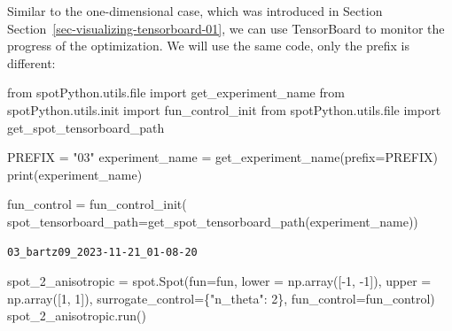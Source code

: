 \documentclass[
  letterpaper,
  DIV=11,
  numbers=noendperiod]{scrreprt}
\newenvironment{Shaded}{\begin{snugshade}}{\end{snugshade}}
\newcommand{\BuiltInTok}[1]{\textcolor[rgb]{0.00,0.23,0.31}{#1}}
\newcommand{\DecValTok}[1]{\textcolor[rgb]{0.68,0.00,0.00}{#1}}
\newcommand{\ImportTok}[1]{\textcolor[rgb]{0.00,0.46,0.62}{#1}}
\newcommand{\NormalTok}[1]{\textcolor[rgb]{0.00,0.23,0.31}{#1}}
\newcommand{\OperatorTok}[1]{\textcolor[rgb]{0.37,0.37,0.37}{#1}}
\newcommand{\StringTok}[1]{\textcolor[rgb]{0.13,0.47,0.30}{#1}}
\begin{document}
\begin{tcolorbox}[enhanced jigsaw, left=2mm, toprule=.15mm, colframe=quarto-callout-note-color-frame, leftrule=.75mm, title=\textcolor{quarto-callout-note-color}{\faInfo}\hspace{0.5em}{TensorBoard}, toptitle=1mm, opacitybacktitle=0.6, arc=.35mm, titlerule=0mm, opacityback=0, bottomtitle=1mm, coltitle=black, rightrule=.15mm, colback=white, colbacktitle=quarto-callout-note-color!10!white, breakable, bottomrule=.15mm]

Similar to the one-dimensional case, which was introduced in Section
Section~\ref{sec-visualizing-tensorboard-01}, we can use TensorBoard to
monitor the progress of the optimization. We will use the same code,
only the prefix is different:

\begin{Shaded}
\begin{Highlighting}[]
\ImportTok{from}\NormalTok{ spotPython.utils.}\BuiltInTok{file} \ImportTok{import}\NormalTok{ get\_experiment\_name}
\ImportTok{from}\NormalTok{ spotPython.utils.init }\ImportTok{import}\NormalTok{ fun\_control\_init}
\ImportTok{from}\NormalTok{ spotPython.utils.}\BuiltInTok{file} \ImportTok{import}\NormalTok{ get\_spot\_tensorboard\_path}

\NormalTok{PREFIX }\OperatorTok{=} \StringTok{"03"}
\NormalTok{experiment\_name }\OperatorTok{=}\NormalTok{ get\_experiment\_name(prefix}\OperatorTok{=}\NormalTok{PREFIX)}
\BuiltInTok{print}\NormalTok{(experiment\_name)}

\NormalTok{fun\_control }\OperatorTok{=}\NormalTok{ fun\_control\_init(}
\NormalTok{    spot\_tensorboard\_path}\OperatorTok{=}\NormalTok{get\_spot\_tensorboard\_path(experiment\_name))}
\end{Highlighting}
\end{Shaded}

\begin{verbatim}
03_bartz09_2023-11-21_01-08-20
\end{verbatim}

\end{tcolorbox}

\begin{Shaded}
\begin{Highlighting}[]
\NormalTok{spot\_2\_anisotropic }\OperatorTok{=}\NormalTok{ spot.Spot(fun}\OperatorTok{=}\NormalTok{fun,}
\NormalTok{                   lower }\OperatorTok{=}\NormalTok{ np.array([}\OperatorTok{{-}}\DecValTok{1}\NormalTok{, }\OperatorTok{{-}}\DecValTok{1}\NormalTok{]),}
\NormalTok{                   upper }\OperatorTok{=}\NormalTok{ np.array([}\DecValTok{1}\NormalTok{, }\DecValTok{1}\NormalTok{]),}
\NormalTok{                   surrogate\_control}\OperatorTok{=}\NormalTok{\{}\StringTok{"n\_theta"}\NormalTok{: }\DecValTok{2}\NormalTok{\},}
\NormalTok{                   fun\_control}\OperatorTok{=}\NormalTok{fun\_control)}
\NormalTok{spot\_2\_anisotropic.run()}
\end{Highlighting}
\end{Shaded}
\end{document}
